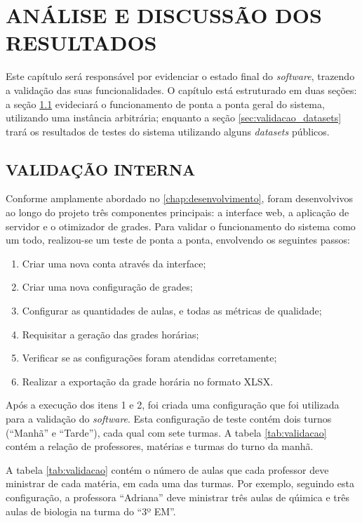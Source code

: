 
\chapter{ANÁLISE E DISCUSSÃO DOS RESULTADOS}
\label{chap:resultados}

Este capítulo será responsável por evidenciar o estado final do \textit{software}, trazendo a validação das suas funcionalidades. O capítulo está estruturado em duas seções: a seção \ref{sec:validacao_geral} evideciará o funcionamento de ponta a ponta geral do sistema, utilizando uma instância arbitrária; enquanto a seção \ref{sec:validacao_datasets} trará os resultados de testes do sistema utilizando alguns \textit{datasets} públicos.

\section{VALIDAÇÃO INTERNA}
\label{sec:validacao_geral}

Conforme amplamente abordado no \autoref{chap:desenvolvimento}, foram desenvolvivos ao longo do projeto três componentes principais: a interface web, a aplicação de servidor e o otimizador de grades. Para validar o funcionamento do sistema como um todo, realizou-se um teste de ponta a ponta, envolvendo os seguintes passos:

\begin{enumerate}
	\item Criar uma nova conta através da interface;
	\item Criar uma nova configuração de grades;
	\item Configurar as quantidades de aulas, e todas as métricas de qualidade;
	\item Requisitar a geração das grades horárias;
	\item Verificar se as configurações foram atendidas corretamente;
	\item Realizar a exportação da grade horária no formato XLSX.
\end{enumerate}

Após a execução dos itens 1 e 2, foi criada uma configuração que foi utilizada para a validação do \textit{software}. Esta configuração de teste contém dois turnos (``Manhã'' e ``Tarde''), cada qual com sete turmas. A tabela \ref{tab:validacao} contém a relação de professores, matérias e turmas do turno da manhã. 

A tabela \ref{tab:validacao} contém o número de aulas que cada professor deve ministrar de cada matéria, em cada uma das turmas. Por exemplo, seguindo esta configuração, a professora ``Adriana'' deve ministrar três aulas de qúimica e três aulas de biologia na turma do ``3º EM''.

